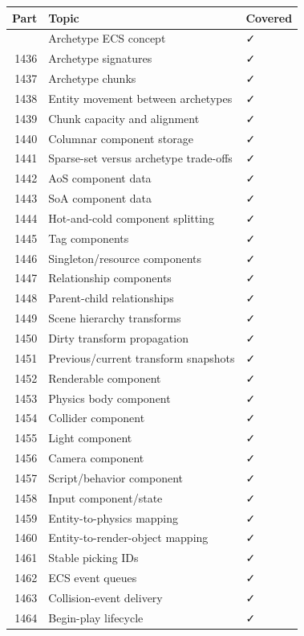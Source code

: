 {\def\LTcaptype{none} %
\begin{longtable}[]{@{}rll@{}}
\toprule\noalign{}
Part & Topic & Covered \\
\midrule\noalign{}
\endhead
\bottomrule\noalign{}
\endlastfoot
1435 & Archetype ECS concept & ✓ \\
1436 & Archetype signatures & ✓ \\
1437 & Archetype chunks & ✓ \\
1438 & Entity movement between archetypes & ✓ \\
1439 & Chunk capacity and alignment & ✓ \\
1440 & Columnar component storage & ✓ \\
1441 & Sparse-set versus archetype trade-offs & ✓ \\
1442 & AoS component data & ✓ \\
1443 & SoA component data & ✓ \\
1444 & Hot-and-cold component splitting & ✓ \\
1445 & Tag components & ✓ \\
1446 & Singleton/resource components & ✓ \\
1447 & Relationship components & ✓ \\
1448 & Parent-child relationships & ✓ \\
1449 & Scene hierarchy transforms & ✓ \\
1450 & Dirty transform propagation & ✓ \\
1451 & Previous/current transform snapshots & ✓ \\
1452 & Renderable component & ✓ \\
1453 & Physics body component & ✓ \\
1454 & Collider component & ✓ \\
1455 & Light component & ✓ \\
1456 & Camera component & ✓ \\
1457 & Script/behavior component & ✓ \\
1458 & Input component/state & ✓ \\
1459 & Entity-to-physics mapping & ✓ \\
1460 & Entity-to-render-object mapping & ✓ \\
1461 & Stable picking IDs & ✓ \\
1462 & ECS event queues & ✓ \\
1463 & Collision-event delivery & ✓ \\
1464 & Begin-play lifecycle & ✓ \\

\end{longtable}}
